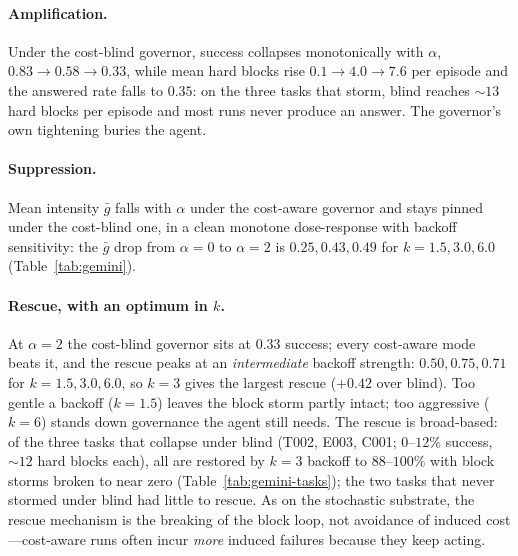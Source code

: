 \documentclass[11pt]{article}
\begin{document}
\paragraph{Amplification.} Under the cost-blind governor, success collapses
monotonically with $\alpha$, $0.83\to0.58\to0.33$, while mean hard blocks rise
$0.1\to4.0\to7.6$ per episode and the answered rate falls to $0.35$: on the
three tasks that storm, blind reaches ${\sim}13$ hard blocks per episode and
most runs never produce an answer. The governor's own tightening buries the
agent.

\paragraph{Suppression.} Mean intensity $\bar g$ falls with $\alpha$ under the
cost-aware governor and stays pinned under the cost-blind one, in a clean
monotone dose-response with backoff sensitivity: the $\bar g$ drop from
$\alpha{=}0$ to $\alpha{=}2$ is $0.25,0.43,0.49$ for $k=1.5,3.0,6.0$
(Table~\ref{tab:gemini}).

\paragraph{Rescue, with an optimum in $k$.} At $\alpha=2$ the cost-blind
governor sits at $0.33$ success; every cost-aware mode beats it, and the rescue
peaks at an \emph{intermediate} backoff strength: $0.50,0.75,0.71$ for
$k=1.5,3.0,6.0$, so $k{=}3$ gives the largest rescue ($+0.42$ over blind). Too
gentle a backoff ($k{=}1.5$) leaves the block storm partly intact; too
aggressive ($k{=}6$) stands down governance the agent still needs. The rescue is
broad-based: of the three tasks that collapse under blind (T002, E003, C001;
$0$--$12\%$ success, ${\sim}12$ hard blocks each), all are restored by $k{=}3$
backoff to $88$--$100\%$ with block storms broken to near zero
(Table~\ref{tab:gemini-tasks}); the two tasks that never stormed under blind had
little to rescue. As on the stochastic substrate, the rescue mechanism is the
breaking of the block loop, not avoidance of induced cost---cost-aware runs
often incur \emph{more} induced failures because they keep acting.
\end{document}
